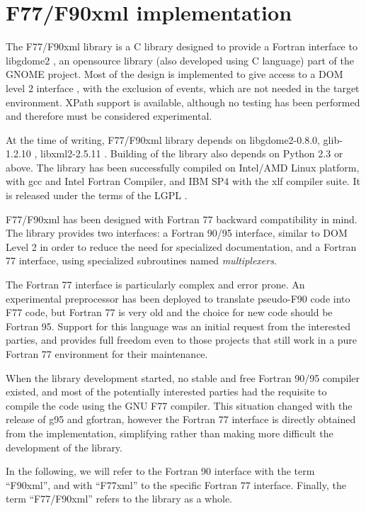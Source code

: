 \section{F77/F90xml implementation}
The F77/F90xml library \cite{f77f90xml-site} is a C library designed to
provide a Fortran interface to libgdome2 \cite{gdome2-site}, an opensource
library (also developed using C language) part of the GNOME
\cite{gnome-site} project. Most of the design is implemented to give access
to a DOM level 2 interface \cite{w3-dom-level-2-site}, with the exclusion of
events, which are not needed in the target environment. XPath support is
available, although no testing has been performed and therefore must be
considered experimental.

At the time of writing, F77/F90xml library depends on libgdome2-0.8.0,
glib-1.2.10 \cite{glib-site}, libxml2-2.5.11 \cite{libxml2-site}.  Building
of the library also depends on Python 2.3 \cite{python-site} or above.  The
library has been successfully compiled on Intel/AMD Linux platform, with gcc
and Intel Fortran Compiler, and IBM SP4 with the xlf compiler suite. It is
released under the terms of the LGPL \cite{lgpl-site}.

F77/F90xml has been designed with Fortran 77 backward compatibility in mind.
The library provides two interfaces: a Fortran 90/95 interface, similar to
DOM Level 2 in order to reduce the need for specialized documentation, and a
Fortran 77 interface, using specialized subroutines named
\textit{multiplexers}.

The Fortran 77 interface is particularly complex and error prone.  An
experimental preprocessor has been deployed to translate pseudo-F90 code
into F77 code, but Fortran 77 is very old and the choice for new code should
be Fortran 95. Support for this language was an initial request from the
interested parties, and provides full freedom even to those projects that
still work in a pure Fortran 77 environment for their maintenance. 

When the library development started, no stable and free Fortran 90/95
compiler existed, and most of the potentially interested parties had the
requisite to compile the code using the GNU F77 compiler.  This situation
changed with the release of g95 and gfortran, however the Fortran 77
interface is directly obtained from the implementation, simplifying rather
than making more difficult the development of the library.

In the following, we will refer to the Fortran 90 interface with the term
``F90xml'', and with ``F77xml'' to the specific Fortran 77 interface.
Finally, the term ``F77/F90xml'' refers to the library as a whole.

